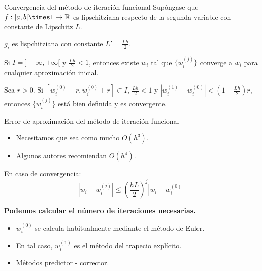 		\begin{frame}{Convergencia del método de iteración funcional}
			\fontsize{10}{12}\selectfont			
			Supóngase que $f: [a,b]\timesI \rightarrow \mathbb{R}$ es lipschitziana respecto de la segunda variable con constante de Lipschitz $L$.
			
			\begin{note}
				$g_i$ es lispchitziana con constante $L' = \frac{Lh}{2}$.
			\end{note}
			
			\begin{proposition}
				Si $I = ]-\infty, +\infty[$ y $\frac{Lh}{2} < 1$, entonces existe $w_i$ tal que $\{w_i^{(j)}\}$ converge a $w_i$ para cualquier aproximación inicial.
			\end{proposition}
			
			\begin{proposition}
				Sea $r > 0$. Si $[w_i^{(0)}-r,w_i^{(0)}+r] \subset I$,  $\frac{Lh}{2} < 1$ y $\left|w_i^{(1)} - w_i^{(0)}\right| < (1-\frac{Lh}{2})r$, entonces $\{w_i^{(j)}\}$ está bien definida y es convergente.
			\end{proposition}
			
		\end{frame}
		
		\begin{frame}{Error de aproximación del método de iteración funcional}
			\begin{tcolorbox}[colback=ChetwodeBlue!10,colframe=ChetwodeBlue!60]
				\begin{itemize}
					\item Necesitamos que sea como mucho $O(h^3)$.
					\item Algunos autores recomiendan $O(h^4)$.	
				\end{itemize}
			\end{tcolorbox}
			
			En caso de convergencia:
			$$ \left|w_i - w_i^{(j)}\right| \le \left(\frac{hL}{2}\right)^j \left|w_i - w_i^{(0)}\right| $$
			
			\textbf{Podemos calcular el número de iteraciones necesarias.}
			
			\begin{itemize}
				\item $w_i^{(0)}$ se calcula habitualmente mediante el método de Euler.
				\item En tal caso, $w_i^{(1)}$ es el método del trapecio explícito.
				\item Métodos predictor - corrector.
			\end{itemize}
		\end{frame}